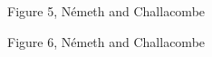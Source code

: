 \documentclass[prl,aps,preprint,superbib,12pt]{revtex4}
\begin{document}
{\begin{center}
Figure 5, N{\'e}meth and Challacombe \\[1.cm]
\end{center}

\clearpage

\begin{center}
Figure 6, N{\'e}meth and Challacombe \\[1.cm]
\end{center}

}
\end{document}
